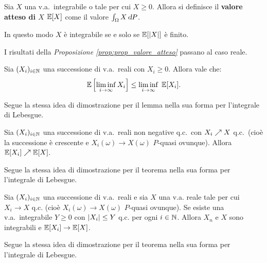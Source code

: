 \begin{multicols*}{2}
\begin{definition}
    Sia $X$ una v.a.~integrabile o tale per cui $X \geq 0$.
    Allora si definisce il \textbf{valore
    atteso di $X$} $\mathbb{E}[X]$ come il valore $\int_\Omega X \dP$.
\end{definition}

\begin{remark}
    In questo modo $X$ è integrabile se e solo se $\mathbb{E}[\left\lvert X \right\rvert]$ è finito.
\end{remark}

\begin{proposition}
    I risultati della \textit{Proposizione \ref{prop:prop_valore_atteso}} passano
    al caso reale.
\end{proposition}

\begin{lemma}[di Fatou]
    Sia $(X_i)_{i \in \mathbb{N}}$ una successione di v.a.~reali con $X_i \geq 0$. Allora vale che:
    \[
        \mathbb{E}\left[\liminf_{i \to \infty} X_i\right] \leq \liminf_{i \to \infty} \; \mathbb{E}[X_i].
    \]

    Segue la stessa idea di dimostrazione per il lemma nella sua forma per l'integrale di Lebesgue.
\end{lemma}

\begin{theorem}
    \label{th:convergenza_monotona}
    Sia $(X_i)_{i \in \mathbb{N}}$ una successione di v.a.~reali non negative q.c.~con
    $X_i \nearrow X$ q.c.~(cioè la successione è crescente e
    $X_i(\omega) \to X(\omega)$ $P$-quasi ovunque). Allora $\mathbb{E}[X_i] \nearrow \mathbb{E}[X]$. \smallskip


    Segue la stessa idea di dimostrazione per il teorema nella sua forma per l'integrale di Lebesgue.
\end{theorem}

\begin{theorem}
    Sia $(X_i)_{i \in \mathbb{N}}$ una successione di v.a.~reali e sia $X$ una v.a. reale tale per cui
    $X_i \to X$ q.c. (cioè $X_i(\omega) \to X(\omega)$ $P$-quasi ovunque). Se esiste una
    v.a.~integrabile $Y \geq 0$ con $\left\lvert X_i \right\rvert \leq Y$ q.c. per ogni $i \in \mathbb{N}$. Allora $X_n$ e
    $X$ sono integrabili e $\mathbb{E}[X_i] \to \mathbb{E}[X]$. \smallskip


    Segue la stessa idea di dimostrazione per il teorema nella sua forma per l'integrale di Lebesgue.
\end{theorem}


\end{multicols*}
